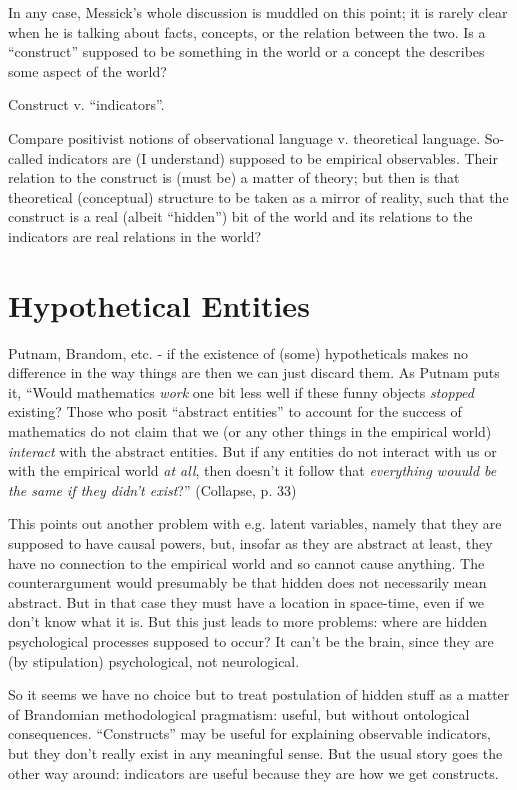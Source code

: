 \documentclass[11pt,twoside]{article}
\begin{document}
In any case, Messick's whole discussion is muddled on this point; it
is rarely clear when he is talking about facts, concepts, or the
relation between the two.  Is a ``construct'' supposed to be something
in the world or a concept the describes some aspect of the world?

Construct v. ``indicators''.

Compare positivist notions of observational language v. theoretical
language.  So-called indicators are (I understand) supposed to be
empirical observables.  Their relation to the construct is (must be) a
matter of theory; but then is that theoretical (conceptual) structure
to be taken as a mirror of reality, such that the construct is a real
(albeit ``hidden'') bit of the world and its relations to the
indicators are real relations in the world?

\section{Hypothetical Entities}

Putnam, Brandom, etc. - if the existence of (some) hypotheticals makes
no difference in the way things are then we can just discard them.  As
Putnam puts it, ``Would mathematics \textit{work} one bit less well if
these funny objects \textit{stopped} existing?  Those who posit
``abstract entities'' to account for the success of mathematics do not
claim that we (or any other things in the empirical world)
\textit{interact} with the abstract entities.  But if any entities do
not interact with us or with the empirical world \textit{at all}, then
doesn't it follow that \textit{everything wouuld be the same if they
  didn't exist}?'' (Collapse, p. 33)

This points out another problem with e.g. latent variables, namely
that they are supposed to have causal powers, but, insofar as they are
abstract at least, they have no connection to the empirical world and
so cannot cause anything.  The counterargument would presumably be
that hidden does not necessarily mean abstract.  But in that case they
must have a location in space-time, even if we don't know what it is.
But this just leads to more problems: where are hidden psychological
processes supposed to occur?  It can't be the brain, since they are
(by stipulation) psychological, not neurological.

So it seems we have no choice but to treat postulation of hidden stuff
as a matter of Brandomian methodological pragmatism: useful, but
without ontological consequences.  ``Constructs'' may be useful for
explaining observable indicators, but they don't really exist in any
meaningful sense.  But the usual story goes the other way around:
indicators are useful because they are how we get constructs.
\end{document}
